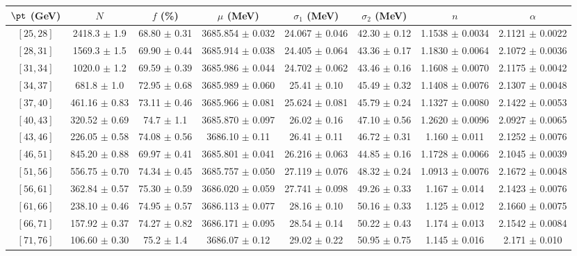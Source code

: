 \begin{tabular}{c||c|c|c|c|c|c|c}
$\pt$ (GeV) & $N$ & $f$ (\%) & $\mu$ (MeV) & $\sigma_1$ (MeV) & $\sigma_2$ (MeV) & $n$ & $\alpha$ \\
\hline
$[25, 28]$ & 2418.3 $\pm$ 1.9 & 68.80 $\pm$ 0.31 & 3685.854 $\pm$ 0.032 & 24.067 $\pm$ 0.046 & 42.30 $\pm$ 0.12 & 1.1538 $\pm$ 0.0034 & 2.1121 $\pm$ 0.0022\\
$[28, 31]$ & 1569.3 $\pm$ 1.5 & 69.90 $\pm$ 0.44 & 3685.914 $\pm$ 0.038 & 24.405 $\pm$ 0.064 & 43.36 $\pm$ 0.17 & 1.1830 $\pm$ 0.0064 & 2.1072 $\pm$ 0.0036\\
$[31, 34]$ & 1020.0 $\pm$ 1.2 & 69.59 $\pm$ 0.39 & 3685.986 $\pm$ 0.044 & 24.702 $\pm$ 0.062 & 43.46 $\pm$ 0.16 & 1.1608 $\pm$ 0.0070 & 2.1175 $\pm$ 0.0042\\
$[34, 37]$ & 681.8 $\pm$ 1.0 & 72.95 $\pm$ 0.68 & 3685.989 $\pm$ 0.060 & 25.41 $\pm$ 0.10 & 45.49 $\pm$ 0.32 & 1.1408 $\pm$ 0.0076 & 2.1307 $\pm$ 0.0048\\
$[37, 40]$ & 461.16 $\pm$ 0.83 & 73.11 $\pm$ 0.46 & 3685.966 $\pm$ 0.081 & 25.624 $\pm$ 0.081 & 45.79 $\pm$ 0.24 & 1.1327 $\pm$ 0.0080 & 2.1422 $\pm$ 0.0053\\
$[40, 43]$ & 320.52 $\pm$ 0.69 & 74.7 $\pm$ 1.1 & 3685.870 $\pm$ 0.097 & 26.02 $\pm$ 0.16 & 47.10 $\pm$ 0.56 & 1.2620 $\pm$ 0.0096 & 2.0927 $\pm$ 0.0065\\
$[43, 46]$ & 226.05 $\pm$ 0.58 & 74.08 $\pm$ 0.56 & 3686.10 $\pm$ 0.11 & 26.41 $\pm$ 0.11 & 46.72 $\pm$ 0.31 & 1.160 $\pm$ 0.011 & 2.1252 $\pm$ 0.0076\\
$[46, 51]$ & 845.20 $\pm$ 0.88 & 69.97 $\pm$ 0.41 & 3685.801 $\pm$ 0.041 & 26.216 $\pm$ 0.063 & 44.85 $\pm$ 0.16 & 1.1728 $\pm$ 0.0066 & 2.1045 $\pm$ 0.0039\\
$[51, 56]$ & 556.75 $\pm$ 0.70 & 74.34 $\pm$ 0.45 & 3685.757 $\pm$ 0.050 & 27.119 $\pm$ 0.076 & 48.32 $\pm$ 0.24 & 1.0913 $\pm$ 0.0076 & 2.1672 $\pm$ 0.0048\\
$[56, 61]$ & 362.84 $\pm$ 0.57 & 75.30 $\pm$ 0.59 & 3686.020 $\pm$ 0.059 & 27.741 $\pm$ 0.098 & 49.26 $\pm$ 0.33 & 1.167 $\pm$ 0.014 & 2.1423 $\pm$ 0.0076\\
$[61, 66]$ & 238.10 $\pm$ 0.46 & 74.95 $\pm$ 0.57 & 3686.113 $\pm$ 0.077 & 28.16 $\pm$ 0.10 & 50.16 $\pm$ 0.33 & 1.125 $\pm$ 0.012 & 2.1660 $\pm$ 0.0075\\
$[66, 71]$ & 157.92 $\pm$ 0.37 & 74.27 $\pm$ 0.82 & 3686.171 $\pm$ 0.095 & 28.54 $\pm$ 0.14 & 50.22 $\pm$ 0.43 & 1.174 $\pm$ 0.013 & 2.1542 $\pm$ 0.0084\\
$[71, 76]$ & 106.60 $\pm$ 0.30 & 75.2 $\pm$ 1.4 & 3686.07 $\pm$ 0.12 & 29.02 $\pm$ 0.22 & 50.95 $\pm$ 0.75 & 1.145 $\pm$ 0.016 & 2.171 $\pm$ 0.010\\

\end{tabular}
